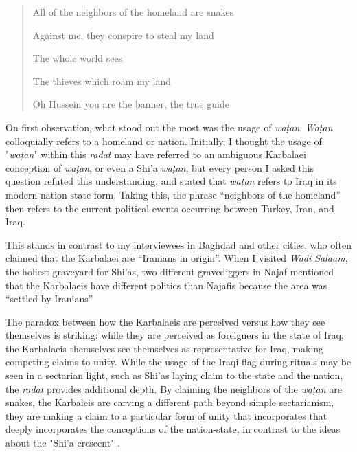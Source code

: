 





\begin{quote}
All of the neighbors of the homeland are snakes

Against me, they conspire to steal my land

The whole world sees

The thieves which roam my land

Oh Hussein you are the banner, the true guide
\end{quote}

On first observation, what stood out the most was the usage of \emph{waṭan}. \emph{Waṭan} colloquially refers to a homeland or nation. Initially, I thought the usage of "\emph{waṭan}" within this \emph{radat} may have referred to an ambiguous Karbalaei conception of \emph{waṭan}, or even a Shi'a \emph{waṭan}, but every person I asked this question refuted this understanding, and stated that \emph{waṭan} refers to Iraq in its modern nation-state form. Taking this, the phrase “neighbors of the homeland” then refers to the current political events occurring between Turkey, Iran, and Iraq. 

This stands in contrast to my interviewees in Baghdad and other cities, who often claimed that the Karbalaei are “Iranians in origin”. When I visited \emph{Wadi Salaam}, the holiest graveyard for Shi'as, two different gravediggers in Najaf mentioned that the Karbalaeis have different politics than Najafis because the area was “settled by Iranians”. 

The paradox between how the Karbalaeis are perceived versus how they see themselves is striking: while they are perceived as foreigners in the state of Iraq, the Karbalaeis themselves see themselves as representative for Iraq, making competing claims to unity. While the usage of the Iraqi flag during rituals may be seen in a sectarian light, such as Shi'as laying claim to the state and the nation, the \emph{radat} provides additional depth. By claiming the neighbors of the \emph{waṭan} are snakes, the Karbaleis are carving a different path beyond simple sectarianism, they are making a claim to a particular form of unity that incorporates that deeply incorporates the conceptions of the nation-state, in contrast to the ideas about the "Shi'a crescent" \cite[120]{haddad_understanding_2020}. 

